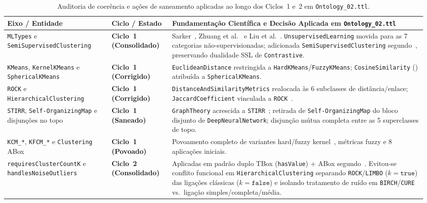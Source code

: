 \documentclass[11pt,a4paper]{article}
\newcommand{\onto}[1]{\texttt{#1}}
\begin{document}
\begin{table}[htbp]
\centering
\caption{Auditoria de coerência e ações de saneamento aplicadas ao longo dos Ciclos~1 e~2 em \texttt{Ontology\_02.ttl}.}
\label{tab:auditoria}
\footnotesize
\begin{tabularx}{\textwidth}{@{}p{2.9cm}p{2.6cm}>{\raggedright\arraybackslash}X@{}}
\toprule
\textbf{Eixo / Entidade} & \textbf{Ciclo / Estado} & \textbf{Fundamentação Científica e Decisão Aplicada em \texttt{Ontology\_02.ttl}} \\
\midrule
\onto{MLTypes} e \onto{SemiSupervisedClustering} & \textbf{Ciclo~1 (Consolidado)} & Sarker~\cite{sarker2021ml}, Zhuang et al.~\cite{zhuang2021transfer} e Liu et al.~\cite{liu2023self}. \onto{UnsupervisedLearning} movida para as 7 categorias não-supervisionadas; adicionada \onto{SemiSupervisedClustering} segundo~\cite{yin2026rapid}, preservando dualidade SSL de \onto{Contrastive}. \\
\addlinespace[3pt]
\onto{KMeans}, \onto{KernelKMeans} e \onto{SphericalKMeans} & \textbf{Ciclo~1 (Corrigido)} & \onto{EuclideanDistance} restringida a \onto{HardKMeans}/\onto{FuzzyKMeans}; \onto{CosineSimilarity} (\cite{dhillon2001concept,yin2026rapid}) atribuída a \onto{SphericalKMeans}. \\
\addlinespace[3pt]
\onto{ROCK} e \onto{HierarchicalClustering} & \textbf{Ciclo~1 (Corrigido)} & \onto{DistanceAndSimilarityMetrics} realocada às 6 subclasses de distância/enlace; \onto{JaccardCoefficient} vinculada a \onto{ROCK}~\cite{nagpal2013review}. \\
\addlinespace[3pt]
\onto{STIRR}, \onto{Self-OrganizingMap} e disjunções no topo & \textbf{Ciclo~1 (Saneado)} & \onto{GraphTheory} acrescida a \onto{STIRR}~\cite{gibson1998clustering}; retirada de \onto{Self-OrganizingMap} do bloco disjunto de \onto{DeepNeuralNetwork}; disjunção mútua completa entre as 5 superclasses de topo. \\
\addlinespace[3pt]
\onto{KCM\_*}, \onto{KFCM\_*} e \onto{Clustering} ABox & \textbf{Ciclo~1 (Povoado)} & Povoamento completo de variantes hard/fuzzy kernel~\cite{decarvalho2018gaussian,simoes2023gaussian}, métricas fuzzy e 8 aplicações iniciais. \\
\addlinespace[3pt]
\onto{requiresClusterCountK} e \onto{handlesNoiseOutliers} & \textbf{Ciclo~2 (Consolidado)} & Aplicadas em padrão duplo TBox (\onto{hasValue}) + ABox segundo~\cite{nagpal2013review,yin2026rapid}. Evitou-se conflito funcional em \onto{HierarchicalClustering} separando \onto{ROCK}/\onto{LIMBO} ($k=\onto{true}$) das ligações clássicas ($k=\onto{false}$) e isolando tratamento de ruído em \onto{BIRCH}/\onto{CURE} vs.\ ligação simples/completa/média. \\

\end{tabularx}
\end{table}
\end{document}
